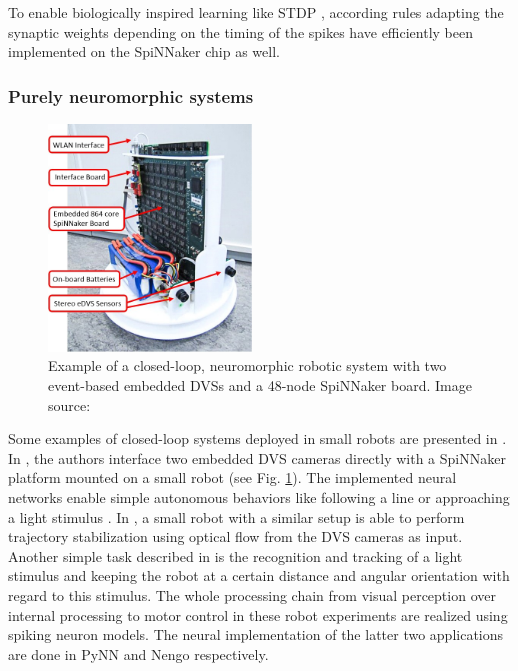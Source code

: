 To enable biologically inspired learning like \ac{STDP} \cite{Bi2001}, according rules adapting the synaptic weights depending on the timing of the spikes have efficiently been implemented on the \ac{SpiNNaker} \cite{Diehl2014} chip as well.
\subsubsection{Purely neuromorphic systems}
\label{subsubsec:neuro_systems}

\begin{figure}[t!]
	\centering
	\includegraphics[width=0.48\textwidth]{imgs/SpinRobot.jpg}
	\caption{Example of a closed-loop, neuromorphic robotic system with two event-based embedded \acp{DVS} and a 48-node \ac{SpiNNaker} board. Image source: \cite{Galluppi2014}}
	\label{fig:spin_robot}
\end{figure}
Some examples of closed-loop systems deployed in small robots are presented in \cite{Davies2010, Denk2013, Galluppi2014}.
In \cite{Davies2010, Denk2013}, the authors interface two embedded \ac{DVS} cameras directly with a \ac{SpiNNaker} platform mounted on a small robot (see Fig. \ref{fig:spin_robot}).
The implemented neural networks enable simple autonomous behaviors like following a line \cite{Davies2010} or approaching a light stimulus \cite{Denk2013}.
In \cite{Galluppi2014}, a small robot with a similar setup is able to perform trajectory stabilization using optical flow from the \ac{DVS} cameras as input.
Another simple task described in \cite{Galluppi2014} is the recognition and tracking of a light stimulus and keeping the robot at a certain distance and angular orientation with regard to this stimulus.
The whole processing chain from visual perception over internal processing to motor control in these robot experiments are realized using spiking neuron models.
The neural implementation of the latter two applications are done in \ac{PyNN} and \ac{Nengo} respectively.

